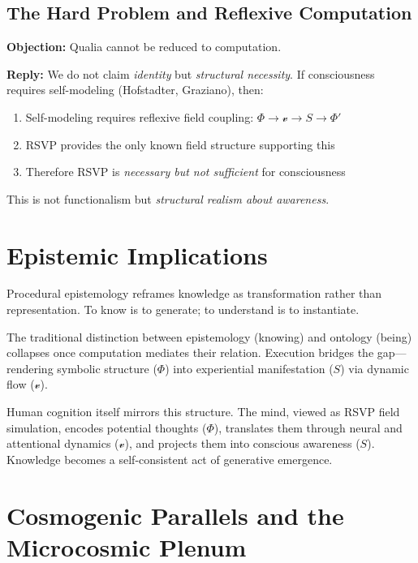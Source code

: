 \documentclass[12pt,a4paper]{article}
\theoremstyle{plain}
\theoremstyle{definition}
\theoremstyle{remark}
\newcommand{\Phifield}{\Phi}
\newcommand{\vfield}{\mathcal{v}}
\newcommand{\Sfield}{S}
\begin{document}
\subsection{The Hard Problem and Reflexive Computation}
\textbf{Objection:} Qualia cannot be reduced to computation.

\textbf{Reply:} We do not claim \textit{identity} but \textit{structural necessity}. If consciousness requires self-modeling (Hofstadter, Graziano), then:
\begin{enumerate}
\item Self-modeling requires reflexive field coupling: $\Phifield \to \vfield \to \Sfield \to \Phifield'$
\item RSVP provides the only known field structure supporting this
\item Therefore RSVP is \textit{necessary but not sufficient} for consciousness
\end{enumerate}

This is not functionalism but \textit{structural realism about awareness}.

\section{Epistemic Implications}
\label{sec:epistemic}

Procedural epistemology reframes knowledge as transformation rather than representation. To know is to generate; to understand is to instantiate.

The traditional distinction between epistemology (knowing) and ontology (being) collapses once computation mediates their relation. Execution bridges the gap—rendering symbolic structure ($\Phifield$) into experiential manifestation ($\Sfield$) via dynamic flow ($\vfield$).

Human cognition itself mirrors this structure. The mind, viewed as RSVP field simulation, encodes potential thoughts ($\Phifield$), translates them through neural and attentional dynamics ($\vfield$), and projects them into conscious awareness ($\Sfield$). Knowledge becomes a self-consistent act of generative emergence.

\section{Cosmogenic Parallels and the Microcosmic Plenum}
\label{sec:cosmogenic}
\end{document}
